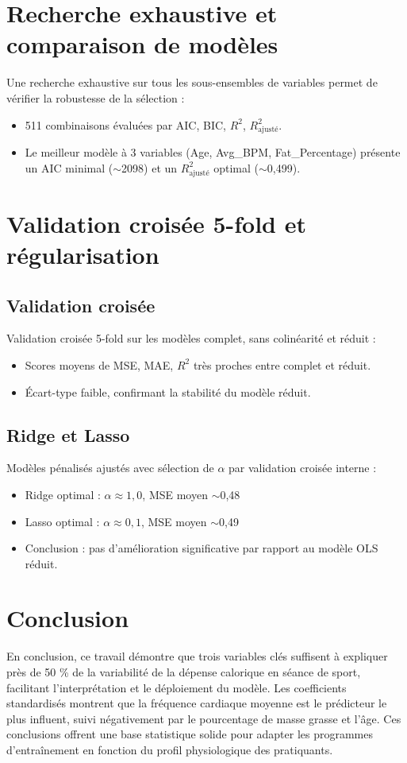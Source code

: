 \documentclass[12pt,a4paper]{article}
\begin{document}
\section{Recherche exhaustive et comparaison de modèles}
Une recherche exhaustive sur tous les sous-ensembles de variables permet de vérifier la robustesse de la sélection :
\begin{itemize}
\item 511 combinaisons évaluées par AIC, BIC, $R^2$, $R^2_{\text{ajusté}}$.
\item Le meilleur modèle à 3 variables (Age, Avg\_BPM, Fat\_Percentage) présente un AIC minimal ($\sim$2098) et un $R^2_{\text{ajusté}}$ optimal ($\sim$0,499).
\end{itemize}

\section{Validation croisée 5-fold et régularisation}

\subsection{Validation croisée}
Validation croisée 5-fold sur les modèles complet, sans colinéarité et réduit :
\begin{itemize}
\item Scores moyens de MSE, MAE, $R^2$ très proches entre complet et réduit.
\item Écart-type faible, confirmant la stabilité du modèle réduit.
\end{itemize}

\subsection{Ridge et Lasso}
Modèles pénalisés ajustés avec sélection de $\alpha$ par validation croisée interne :
\begin{itemize}
\item Ridge optimal : $\alpha \approx 1{,}0$, MSE moyen $\sim$0,48
\item Lasso optimal : $\alpha \approx 0{,}1$, MSE moyen $\sim$0,49
\item Conclusion : pas d’amélioration significative par rapport au modèle OLS réduit.
\end{itemize}

\section{Conclusion}
En conclusion, ce travail démontre que trois variables clés suffisent à expliquer près de 50 \% de la variabilité de la dépense calorique en séance de sport, facilitant l’interprétation et le déploiement du modèle. Les coefficients standardisés montrent que la fréquence cardiaque moyenne est le prédicteur le plus influent, suivi négativement par le pourcentage de masse grasse et l’âge. Ces conclusions offrent une base statistique solide pour adapter les programmes d’entraînement en fonction du profil physiologique des pratiquants. 

\newpage
\end{document}
